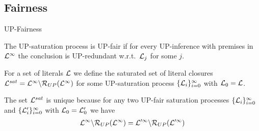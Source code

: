 \documentclass[%
handout,
]{beamer}
\begin{document}
\subsection{Fairness}
\begin{frame}{UP-Fairness}

        The UP-saturation process is {UP-fair} if for every UP-inference
        with premises in \( \mathcal{L}^\infty \) the conclusion is UP-redundant
        w.r.t.~\(\mathcal{L}_j\) for some \(j\).

        For a set of literals \( \mathcal{L} \) we define
        the saturated set of literal closures
        \( \mathcal{L}^{sat} = \mathcal{L}^\infty\backslash\mathcal{R}_{UP}(\mathcal{L}^\infty) \)
        for some UP-saturation process
        \( \{ \mathcal{L}_i\}_{i=0}^\infty \)
        with $\mathcal{L}_0 = \mathcal{L}$.

        \vspace{1.4em}

    \begin{lemma}
        The set \( \mathcal{L}^{sat} \) is unique because
        for any two UP-fair saturation processes
        \(\{ \mathcal{L}_i
            \}_{i=0}^\infty\) and
            \(\{ \mathcal{L}'_i
            \}_{i=0}^\infty\)
            with $\mathcal{L}_0 = \mathcal{L}'_0$ we have
            \begin{gather*}
                \mathcal{L}^\infty \backslash \mathcal{R}_{UP}(\mathcal{L}^\infty)
                =
                \mathcal{L}'^\infty \backslash \mathcal{R}_{UP}(\mathcal{L}'^\infty)
            \end{gather*}
    \end{lemma}
\end{frame}
\end{document}
